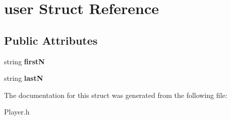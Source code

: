 \hypertarget{structuser}{\section{user Struct Reference}
\label{structuser}
}
\subsection*{Public Attributes}
\begin{DoxyCompactItemize}
\item 
\hypertarget{structuser_a5509b1c7685e0c73bf8c2386c51ddd4a}{string {\bfseries first\-N}}\label{structuser_a5509b1c7685e0c73bf8c2386c51ddd4a}

\item 
\hypertarget{structuser_a13e31a92ed60ea2c6dbca3e1eb2ea1b3}{string {\bfseries last\-N}}\label{structuser_a13e31a92ed60ea2c6dbca3e1eb2ea1b3}

\end{DoxyCompactItemize}


The documentation for this struct was generated from the following file\-:\begin{DoxyCompactItemize}
\item 
Player.\-h\end{DoxyCompactItemize}
